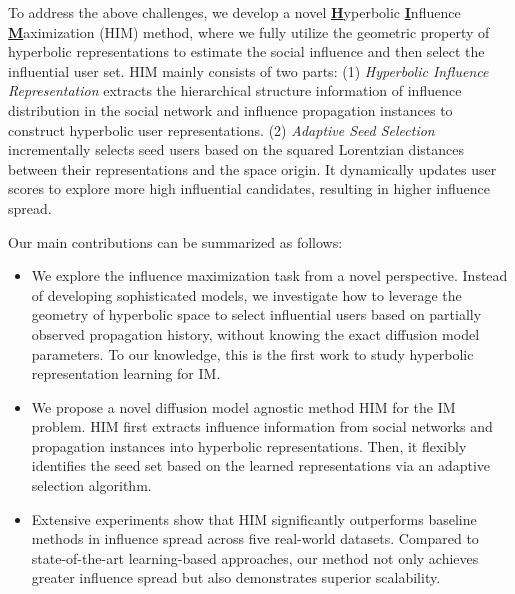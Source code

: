 To address the above challenges, we develop a novel \underline{\textbf{H}}yperbolic \underline{\textbf{I}}nfluence \underline{\textbf{M}}aximization (HIM) method, where we fully utilize the geometric property of hyperbolic representations to estimate the social influence and then select the influential user set.
HIM mainly consists of two parts: (1) \emph{Hyperbolic Influence Representation} extracts the hierarchical structure information of influence distribution in the social network and influence propagation instances to construct hyperbolic user representations.
(2) \emph{Adaptive Seed Selection} incrementally selects seed users based on the squared Lorentzian distances between their representations and the space origin. It dynamically updates user scores to explore more high influential candidates, resulting in higher influence spread.

Our main contributions can be summarized as follows:
\begin{itemize}
     \item We explore the influence maximization task from a novel perspective. Instead of developing sophisticated models, we investigate how to leverage the geometry of hyperbolic space to select influential users based on partially observed propagation history, without knowing the exact diffusion model parameters. To our knowledge, this is the first work to study hyperbolic representation learning for IM.
    \item We propose a novel diffusion model agnostic method HIM for the IM problem. HIM first extracts influence information from social networks and propagation instances into hyperbolic representations.
    Then, it flexibly identifies the seed set based on the learned representations via an adaptive selection algorithm.
    \item Extensive experiments show that HIM significantly outperforms baseline methods in influence spread across five real-world datasets. Compared to state-of-the-art learning-based approaches, our method not only achieves greater influence spread but also demonstrates superior scalability. 
\end{itemize}
